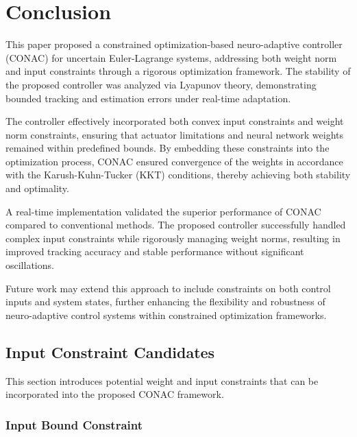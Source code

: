 \documentclass[journal]{IEEEtran}
\begin{document}
\section{Conclusion}\label{sec:conclusion}

This paper proposed a constrained optimization-based neuro-adaptive controller (CONAC) for uncertain Euler-Lagrange systems, addressing both weight norm and input constraints through a rigorous optimization framework. 
The stability of the proposed controller was analyzed via Lyapunov theory, demonstrating bounded tracking and estimation errors under real-time adaptation.

The controller effectively incorporated both convex input constraints and weight norm constraints, ensuring that actuator limitations and neural network weights remained within predefined bounds. 
By embedding these constraints into the optimization process, CONAC ensured convergence of the weights in accordance with the Karush-Kuhn-Tucker (KKT) conditions, thereby achieving both stability and optimality.

A real-time implementation validated the superior performance of CONAC compared to conventional methods. 
The proposed controller successfully handled complex input constraints while rigorously managing weight norms, resulting in improved tracking accuracy and stable performance without significant oscillations.

Future work may extend this approach to include constraints on both control inputs and system states, further enhancing the flexibility and robustness of neuro-adaptive control systems within constrained optimization frameworks.

\appendix

\subsection{Input Constraint Candidates}\label{sec:appen:cstr} 

This section introduces potential weight and input constraints that can be incorporated into the proposed CONAC framework.

\subsubsection{Input Bound Constraint}\label{sec:appen:cstr:input:bound}
\end{document}
